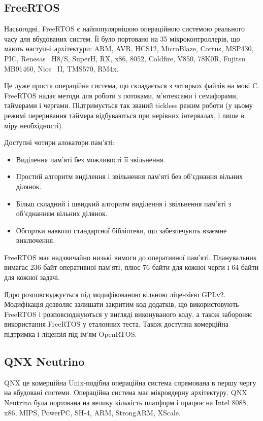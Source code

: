 \documentclass[oneside,14pt,a4paper,final]{myextreport}
\begin{document}
\subsection{FreeRTOS}

Насьогодні, FreeRTOS\cite{freertos} є найпопулярнішою операційною системою реального часу для вбудованих систем\cite{freertos:popular}. Її було портовано на 35 мікроконтроллерів, що мають наступні архітектури: ARM, AVR, HCS12, MicroBlaze, Cortus, MSP430, PIC, Renesas~ H8/S, SuperH, RX, x86, 8052, Coldfire, V850, 78K0R, Fujitsu MB91460, Nios~ II, TMS570, RM4x.

Це дуже проста операційна система, що складається з чотирьох файлів на мові C. FreeRTOS надає методи для роботи з потоками, м'ютексами і семафорами, таймерами і чергами. Підтримується так званий tickless режим роботи (у цьому режимі переривання таймера відбуваються при нерівних інтервалах, і лише в міру необхідності).

Доступні чотири алокатори пам'яті:
\begin{itemize}
  \item Виділення пам'яті без можливості її звільнення.
  \item Простий алгоритм виділення і звільнення пам'яті без об'єднання вільних ділянок.
  \item Більш складний і швидкий алгоритм виділення і звільнення пам'яті з об'єднанням вільних ділянок.
  \item Обгортки навколо стандартної бібліотеки, що забезпечують взаємне виключення.
\end{itemize}

FreeRTOS має надзвичайно низькі вимоги до оперативної пам'яті. Планувальник вимагає 236 байт оперативної пам'яті, плюс 76 байти для кожної черги і 64 байти для кожної задачі.

Ядро розповсюджується під модифікованою вільною ліцензією GPLv2\cite{freertos:license}. Модифікація дозволяє залишати закритим код додатків, що використовують FreeRTOS і розповсюджуються у вигляді виконуваного коду, а також забороняє використання FreeRTOS у еталонних теста. Також доступна комерційна підтримка і ліцензія під ім'ям OpenRTOS\cite{openrtos}.

\subsection{QNX Neutrino}

QNX\cite{qnx} це комерційна Unix-подібна операційна система спрямована в першу чергу на вбудовані системи. Операційна система має мікроядерну архітектуру. QNX Neutrino була портована на велику кількість платформ і працює на Intel 8088, x86, MIPS, PowerPC, SH-4, ARM, StrongARM, XScale.
\end{document}
